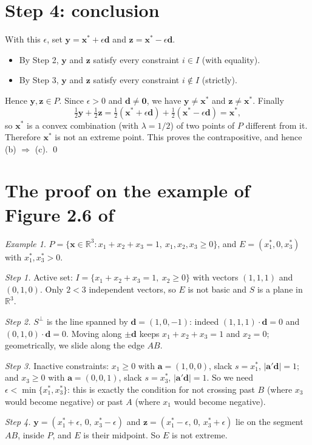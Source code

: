 \documentclass[11pt]{article}
\theoremstyle{remark}
\newtheorem*{example}{Example}
\begin{document}
\section*{Step 4: conclusion}
With this $\epsilon$, set $\mathbf y=\mathbf x^*+\epsilon\mathbf d$ and $\mathbf z=\mathbf x^*-\epsilon\mathbf d$.
\begin{itemize}
  \item By Step 2, $\mathbf y$ and $\mathbf z$ satisfy every constraint $i\in I$ (with equality).
  \item By Step 3, $\mathbf y$ and $\mathbf z$ satisfy every constraint $i\notin I$ (strictly).
\end{itemize}
Hence $\mathbf y,\mathbf z\in P$. Since $\epsilon>0$ and $\mathbf d\ne\mathbf 0$, we have $\mathbf y\neq\mathbf x^*$ and $\mathbf z\neq\mathbf x^*$. Finally
\[
\tfrac12\mathbf y+\tfrac12\mathbf z = \tfrac12(\mathbf x^*+\epsilon\mathbf d)+\tfrac12(\mathbf x^*-\epsilon\mathbf d)=\mathbf x^*,
\]
so $\mathbf x^*$ is a convex combination (with $\lambda=1/2$) of two points of $P$ different from it. Therefore $\mathbf x^*$ is not an extreme point. This proves the contrapositive, and hence (b) $\Rightarrow$ (c). \qed

\section*{The proof on the example of Figure 2.6 of \cite{BT97}}
\begin{example}
$P=\{\mathbf x\in\mathbb{R}^3 : x_1+x_2+x_3=1,\ x_1,x_2,x_3\ge 0\}$, and $E=(x_1^*,0,x_3^*)$ with $x_1^*,x_3^*>0$.

\emph{Step 1.} Active set: $I=\{x_1+x_2+x_3=1,\ x_2\ge 0\}$ with vectors $(1,1,1)$ and $(0,1,0)$. Only $2<3$ independent vectors, so $E$ is not basic and $S$ is a plane in $\mathbb{R}^3$.

\emph{Step 2.} $S^\perp$ is the line spanned by $\mathbf d=(1,0,-1)$: indeed $(1,1,1)\cdot\mathbf d=0$ and $(0,1,0)\cdot\mathbf d=0$. Moving along $\pm\mathbf d$ keeps $x_1+x_2+x_3=1$ and $x_2=0$; geometrically, we slide along the edge $AB$.

\emph{Step 3.} Inactive constraints: $x_1\ge0$ with $\mathbf a=(1,0,0)$, slack $s=x_1^*$, $|\mathbf a'\mathbf d|=1$; and $x_3\ge0$ with $\mathbf a=(0,0,1)$, slack $s=x_3^*$, $|\mathbf a'\mathbf d|=1$. So we need $\epsilon<\min\{x_1^*,x_3^*\}$: this is exactly the condition for not crossing past $B$ (where $x_3$ would become negative) or past $A$ (where $x_1$ would become negative).

\emph{Step 4.} $\mathbf y=(x_1^*+\epsilon,\,0,\,x_3^*-\epsilon)$ and $\mathbf z=(x_1^*-\epsilon,\,0,\,x_3^*+\epsilon)$ lie on the segment $AB$, inside $P$, and $E$ is their midpoint. So $E$ is not extreme.
\end{example}
\end{document}
